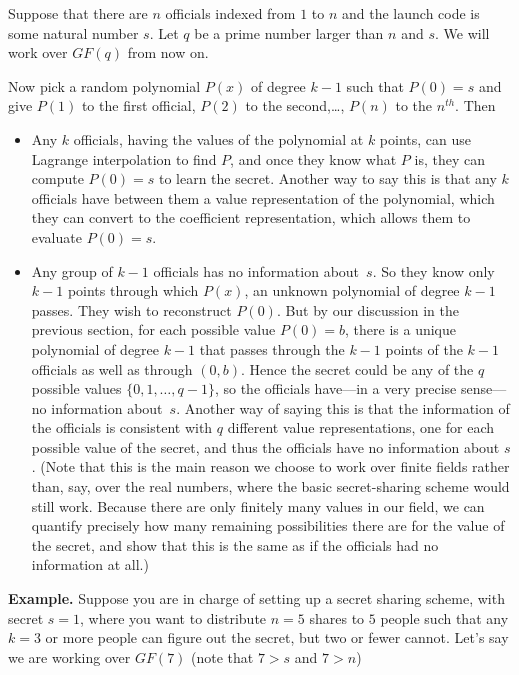 \documentclass[11pt,fleqn]{article}
\begin{document}
Suppose that there are $n$ officials indexed from $1$ to $n$ and the launch code is some
natural number $s$. Let $q$ be a prime number larger than $n$ and $s$.
We will work over $GF(q)$ from now on.

Now pick a random polynomial $P(x)$ of degree $k - 1$ such that $P(0) = s$ and give
$P(1)$ to the first official, $P(2)$ to the second,\ldots, $P(n)$ to the $n^{th}$. Then
\begin{itemize}

\item Any $k$ officials, having the values of the polynomial at $k$
points, can use Lagrange interpolation to find $P$, and once they know
what $P$ is, they can compute $P(0) = s$ to learn the secret. 
Another way to say this is that any $k$ officials have between them a value representation of the polynomial,
which they can convert to the coefficient representation, which allows them to evaluate $P(0) = s$. 

\item Any group of $k - 1$ officials has no information about~$s$.
So they know only $k-1$ points through which $P(x)$, an unknown polynomial of 
degree $k-1$ passes. They wish to reconstruct $P(0)$. But by our discussion 
in the previous section, for each possible value $P(0) = b$, there is a unique 
polynomial of degree $k-1$ that passes through the $k-1$ points of the $k-1$ officials
as well as through $(0, b)$. Hence the secret could
be any of the $q$ possible values $\{0,1,\ldots,q-1\}$, so the officials
have---in a very precise sense---no information about~$s$. 
Another way of saying this is that the information of the officials is consistent
with $q$ different value representations, one for each possible value of the secret, 
and thus the officials have no information about $s$. 
(Note that
this is the main reason we choose to work over finite fields rather than,
say, over the real numbers, where the basic secret-sharing scheme would
still work.  Because there are only finitely many values
in our field, we can quantify precisely how many remaining possibilities
there are for the value of the secret, and show that this is the same as if
the officials had no information at all.)
\end{itemize}
\textbf{Example.} Suppose you are in charge of setting up a secret
sharing scheme, with secret $s=1$, where you want to distribute 
$n = 5$ shares to $5$ people such that any $k = 3$ or more people can 
figure out the secret, but two or fewer cannot. Let's say we are working 
over $GF(7)$ (note that $7>s$ and $7>n$) 
\end{document}
